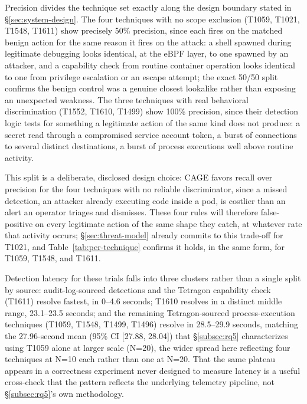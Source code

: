 \documentclass{ieeeaccess}
\begin{document}
Precision divides the technique set exactly along the design boundary
stated in \S\ref{sec:system-design}. The four techniques with no scope
exclusion (T1059, T1021, T1548, T1611) show precisely 50\% precision,
since each fires on the matched benign action for the same reason it
fires on the attack: a shell spawned during legitimate debugging looks
identical, at the eBPF layer, to one spawned by an attacker, and a
capability check from routine container operation looks identical to
one from privilege escalation or an escape attempt; the exact 50/50
split confirms the benign control was a genuine closest lookalike
rather than exposing an unexpected weakness. The three techniques with
real behavioral discrimination (T1552, T1610, T1499) show 100\%
precision, since their detection logic tests for something a
legitimate action of the same kind does not produce: a secret read
through a compromised service account token, a burst of connections to
several distinct destinations, a burst of process executions well
above routine activity.

This split is a deliberate, disclosed design choice: CAGE favors
recall over precision for the four techniques with no reliable
discriminator, since a missed detection, an attacker already executing
code inside a pod, is costlier than an alert an operator triages and
dismisses. These four rules will therefore false-positive on every
legitimate action of the same shape they catch, at whatever rate that
activity occurs; \S\ref{sec:threat-model} already commits to this
trade-off for T1021, and Table~\ref{tab:per-technique} confirms it
holds, in the same form, for T1059, T1548, and T1611.

Detection latency for these trials falls into three clusters rather
than a single split by source: audit-log-sourced detections and the
Tetragon capability check (T1611) resolve fastest, in 0--4.6 seconds;
T1610 resolves in a distinct middle range, 23.1--23.5 seconds; and the
remaining Tetragon-sourced process-execution techniques (T1059, T1548,
T1499, T1496) resolve in 28.5--29.9 seconds, matching the 27.96-second
mean (95\% CI [27.88, 28.04]) that \S\ref{subsec:rq5} characterizes using T1059
alone at larger scale (N=20), the wider spread here reflecting four
techniques at N=10 each rather than one at N=20. That the same plateau
appears in a correctness experiment never designed to measure latency
is a useful cross-check that the pattern reflects the underlying
telemetry pipeline, not \S\ref{subsec:rq5}'s own methodology.
\end{document}

